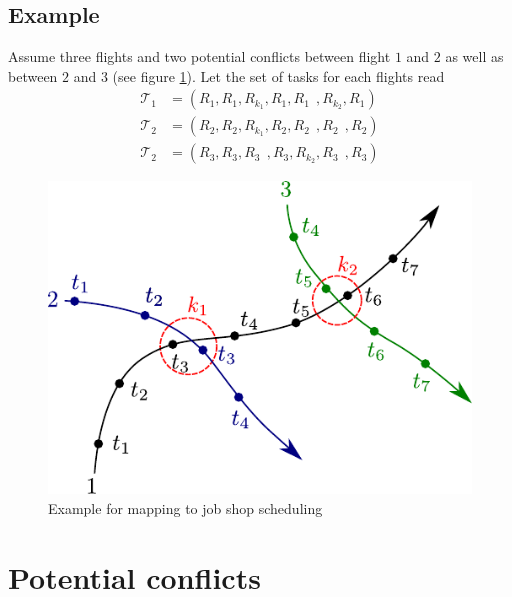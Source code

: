 \documentclass{article}
\begin{document}
\subsection{Example}
Assume three flights and two potential conflicts between flight $1$ and $2$ as well as between $2$ and $3$ (see figure \ref{fig:jobshop_example}).
Let the set of tasks for each flights read
\begin{align*}
    \mathcal{T}_1 &= \left(R_1, R_1, R_{k_1}, R_1, R_1\;\,, R_{k_2}, R_1\right) \\
    \mathcal{T}_2 &= \left(R_2, R_2, R_{k_1}, R_2, R_2\;\,, R_2\;\,, R_2 \right) \\
    \mathcal{T}_2 &= \left(R_3, R_3, R_3\;\,, R_3, R_{k_2}, R_3\;\,, R_3 \right) 
\end{align*}

\begin{figure}[htpb]
    \centering
    \includegraphics[width=0.6\linewidth]{pics/jobshop_example}
    \caption{Example for mapping to job shop scheduling}
    \label{fig:jobshop_example}
\end{figure}

\newpage
\appendix
\section{Potential conflicts}
\label{app:potential_conflicts}
\end{document}
